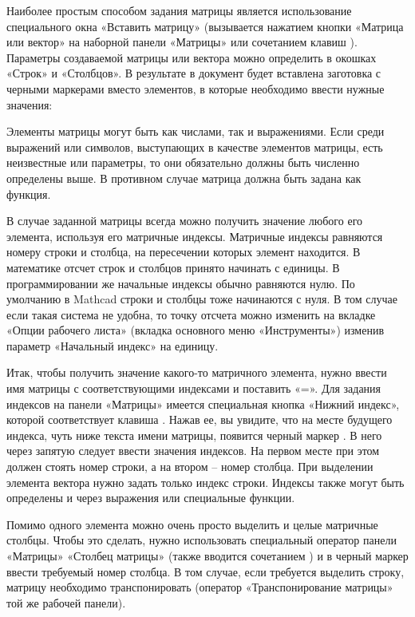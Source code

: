 Наиболее простым способом задания матрицы является использование специального окна «Вставить матрицу» (вызывается нажатием кнопки «Матрица или вектор» на наборной панели «Матрицы» или сочетанием клавиш ). Параметры создаваемой матрицы или вектора можно определить в окошках «Строк» и «Столбцов». В результате в документ будет вставлена заготовка с черными маркерами вместо элементов, в которые необходимо ввести нужные значения:


Элементы матрицы могут быть как числами, так и выражениями. Если среди выражений или символов, выступающих в качестве элементов матрицы, есть неизвестные или параметры, то они обязательно должны быть численно определены выше. В противном случае матрица должна быть задана как функция.


В случае заданной матрицы всегда можно получить значение любого его элемента, используя его матричные индексы. Матричные индексы равняются номеру строки и столбца, на пересечении которых элемент находится. В математике отсчет строк и столбцов принято начинать с единицы. В программировании же начальные индексы обычно равняются нулю. По умолчанию в Mathcad строки и столбцы тоже начинаются с нуля. В том случае если такая система не удобна, то точку отсчета можно изменить на вкладке «Опции рабочего листа» (вкладка основного меню «Инструменты») изменив параметр «Начальный индекс» на единицу.

Итак, чтобы получить значение какого-то матричного элемента, нужно ввести имя матрицы с соответствующими индексами и поставить «=». Для задания индексов на панели «Матрицы» имеется специальная кнопка «Нижний индекс», которой соответствует клавиша \keys{[} . Нажав ее, вы увидите, что на месте будущего индекса, чуть ниже текста имени матрицы, появится черный маркер . В него через запятую следует ввести значения индексов. На первом месте при этом должен стоять номер строки, а на втором – номер столбца. При выделении элемента вектора нужно задать только индекс строки. Индексы также могут быть определены и через выражения или специальные функции.

Помимо одного элемента можно очень просто выделить и целые матричные столбцы. Чтобы это сделать, нужно использовать специальный оператор панели «Матрицы» «Столбец матрицы» (также вводится сочетанием  )  и в черный маркер ввести требуемый номер столбца. В том случае, если требуется выделить строку, матрицу необходимо транспонировать (оператор «Транспонирование матрицы» той же рабочей панели).

